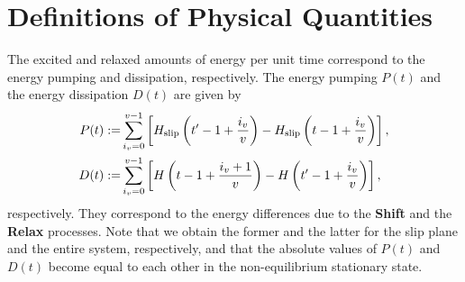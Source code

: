 \section{Definitions of Physical Quantities}\label{sec:defquan}
The excited and relaxed amounts of energy per unit time correspond to the energy pumping and dissipation, respectively. The energy pumping $P(t)$ and the energy dissipation $D(t)$ are given by
\begin{align}
P(t):=&\sum_{i_{v}=0}^{v-1}\left[ H_{\rm slip}\left(t'-1+\frac{i_{v}}{v}\right) - H_{\rm slip}\left(t-1+\frac{i_{v}}{v}\right)\right]\label{def:Pump},\\
D(t):=&\sum_{i_{v}=0}^{v-1}\left[ H\left(t-1+\frac{i_{v}+1}{v}\right) - H\left(t'-1+\frac{i_{v}}{v}\right)\right]\label{def:Diss},
\end{align}
respectively. They correspond to the energy differences due to the \textbf{Shift} and the \textbf{Relax} processes. Note that we obtain the former and the latter for the slip plane and the entire system, respectively, and that the absolute values of $P(t)$ and $D(t)$ become equal to each other in the non-equilibrium stationary state.

